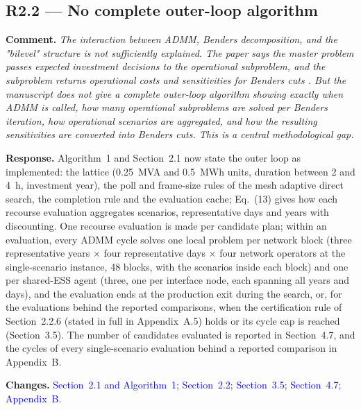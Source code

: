 \documentclass[11pt]{article}
\newcommand{\rcomment}[1]{\par\medskip\noindent\textbf{Comment.} \textit{#1}\par\smallskip}
\newcommand{\rresponse}[1]{\noindent\textbf{Response.} #1\par\smallskip}
\newcommand{\rchanges}[1]{\noindent\textbf{Changes.} \textcolor{blue}{#1}\par\medskip}
\begin{document}
\subsection*{R2.2 --- No complete outer-loop algorithm}
\rcomment{The interaction between ADMM, Benders decomposition, and the "bilevel" structure is not sufficiently explained. The paper says the master problem passes expected investment decisions to the operational subproblem, and the subproblem returns operational costs and sensitivities for Benders cuts . But the manuscript does not give a complete outer-loop algorithm showing exactly when ADMM is called, how many operational subproblems are solved per Benders iteration, how operational scenarios are aggregated, and how the resulting sensitivities are converted into Benders cuts. This is a central methodological gap.}
\rresponse{Algorithm~1 and Section~2.1 now state the outer loop as implemented: the lattice (0.25~MVA and 0.5~MWh units, duration between 2 and 4~h, investment year), the poll and frame-size rules of the mesh adaptive direct search, the completion rule and the evaluation cache; Eq.~(13) gives how each recourse evaluation aggregates scenarios, representative days and years with discounting. One recourse evaluation is made per candidate plan; within an evaluation, every ADMM cycle solves one local problem per network block (three representative years $\times$ four representative days $\times$ four network operators at the single-scenario instance, 48 blocks, with the scenarios inside each block) and one per shared-ESS agent (three, one per interface node, each spanning all years and days), and the evaluation ends at the production exit during the search, or, for the evaluations behind the reported comparisons, when the certification rule of Section~2.2.6 (stated in full in Appendix~A.5) holds or its cycle cap is reached (Section~3.5). The number of candidates evaluated is reported in Section~4.7, and the cycles of every single-scenario evaluation behind a reported comparison in Appendix~B.}
\rchanges{Section~2.1 and Algorithm~1; Section~2.2; Section~3.5; Section~4.7; Appendix~B.}
\end{document}
